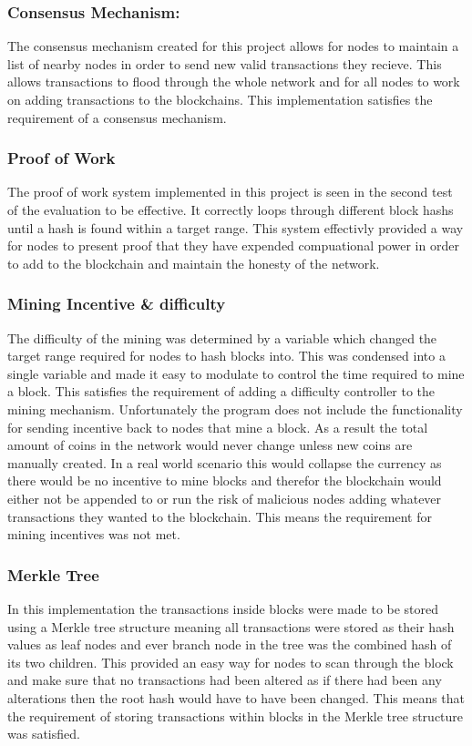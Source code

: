 \documentclass{l4proj}
\begin{document}
\subsubsection{Consensus Mechanism:}
The consensus mechanism created for this project allows for nodes to maintain a list of nearby nodes in order to send
new valid transactions they recieve. This allows transactions to flood through the whole network and for all nodes to
work on adding transactions to the blockchains. This implementation satisfies the requirement of a consensus mechanism.
\subsubsection{Proof of Work}
The proof of work system implemented in this project is seen in the second test of the evaluation to be effective. It
correctly loops through different block hashs until a hash is found within a target range. This system effectivly provided a way for nodes to present
proof that they have expended compuational power in order to add to the blockchain and maintain the honesty of the 
network.
\subsubsection{Mining Incentive \& difficulty}
The difficulty of the mining was determined by a variable which changed the target range required for nodes to hash
blocks into. This was condensed into a single variable and made it easy to modulate to control the time required to 
mine a block. This satisfies the requirement of adding a difficulty controller to the mining mechanism. Unfortunately
the program does not include the functionality for sending incentive back to nodes that mine a block. As a result the
total amount of coins in the network would never change unless new coins are manually created. In a real world scenario
this would collapse the currency as there would be no incentive to mine blocks and therefor the blockchain would either
not be appended to or run the risk of malicious nodes adding whatever transactions they wanted to the blockchain. This
means the requirement for mining incentives was not met.
\subsubsection{Merkle Tree}
In this implementation the transactions inside blocks were made to be stored using a Merkle tree structure meaning
all transactions were stored as their hash values as leaf nodes and ever branch node in the tree was the combined hash
of its two children. This provided an easy way for nodes to scan through the block and make sure that no transactions
had been altered as if there had been any alterations then the root hash would have to have been changed. This means
that the requirement of storing transactions within blocks in the Merkle tree structure was satisfied.
\end{document}
